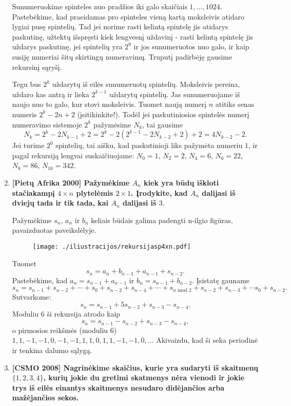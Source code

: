 \begin{enumerate}
Sunumeruokime spinteles nuo pradžios iki galo skaičiais $1,\dots,1024$. Pastebėkime, kad praeidamas pro spinteles vieną kartą moksleivis atidaro lygiai pusę spintelių. Tad jei norime rasti kelintą spintelę jis atidarys paskutinę, užtektų išspręsti kiek lengvesnį uždavinį - rasti kelintą spintelę jis uždarys paskutinę, jei spintelių yra $2^9$ ir jos sunumeruotos nuo galo, ir kaip susiję numeriai šitų skirtingų numeravimų. Truputį padirbėję gausime rekursinį sąryšį.

Tegu bus $2^k$ uždarytų iš eilės sunumeruotų spintelių. Moksleivis pereina, uždaro kas antrą ir lieka $2^{k-1}$ uždarytų spintelių. Jas sunumeruojame iš naujo nuo to galo, kur stovi moksleivis. Tuomet naują numerį $n$ atitiks senas numeris $2^k - 2n + 2$ (įsitikinkite!). Todėl jei paskutiniosios spintelės numerį numeravimo sistemoje $2^k$ pažymėsime $N_k$, tai gausime $$N_k = 2^k - 2N_{k-1} + 2= 2^k - 2(2^{k-1} - 2 N_{k-2} + 2) + 2 = 4N_{k-2} - 2.$$ Jei turime $2^0$ spintelių, tai aišku, kad paskutinioji liks pažymėta numeriu $1$, ir pagal rekursiją lengvai suskaičiuojame: $N_0 = 1$, $N_2 = 2$, $N_4 = 6$, $N_6 = 22$, $N_8 = 86$, $N_{10} = 342.$\medskip  

\item {\bf [Pietų Afrika 2000] Pažymėkime $A_n$ kiek yra būdų iškloti stačiakampį $4 \times n$ plytelėmis $2 \times 1$. Įrodykite, kad $A_n$ dalijasi iš dviejų tada ir tik tada, kai $A_n$ dalijasi iš $3.$}

Pažymėkime $s_n$, $a_n$ ir $b_n$ keliais būdais galima padengti n-ilgio figūras, pavaizduotas paveikslėlyje. 

\begin{figure}[h]
\centering\texttt{[image: ./iliustracijos/rekursijasp4xn.pdf]}
\end{figure}

Tuomet $$s_n = a_n + b_{n-1} + a_{n-1} + s_{n-2}.$$ Pastebėkime, kad $a_n = s_{n-1} + a_{n-1}$ ir $b_n = s_{n-1} + b_{n-2}.$ Įsistatę gauname $$s_n = s_{n-1} + s_{n-2} + \cdots + s_0 + s_{n-2} + s_{n-4} + \cdots + s_{n\text{ mod } 2} + s_{n-2} + s_{n-3} + \cdots s_0 + s_{n-2}.$$ 
Sutvarkome: $$s_n = s_{n-1} + 5s_{n-2} + s_{n-3} - s_{n-4}.$$ Moduliu $6$ ši rekursija atrodo kaip $$s_n = s_{n-1} - s_{n-2} + s_{n-3} - s_{n-4},$$ o pirmosios reikšmės (moduliu $6$) $1,1,-1,-1,0,-1,-1,1,1,0,1,1,-1,-1,0,\dots$ Akivaizdu, kad ši seka periodinė ir tenkina dalumo sąlygą.\medskip


\item {\bf [CSMO 2008] Nagrinėkime skaičius, kurie yra sudaryti iš skaitmenų $\{1,2,3,4\}$, kurių jokie du gretimi skatmenys nėra vienodi ir jokie trys iš eilės einantys skaitmenys nesudaro didėjančios arba mažėjančios sekos. 

}
\end{enumerate}
